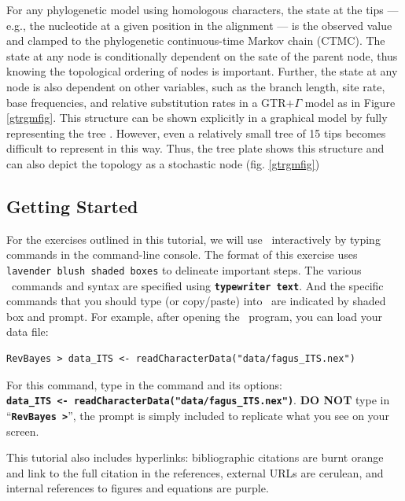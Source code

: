 \documentclass[11pt]{article}
\newcommand{\cl}[1]{{\texttt{\textbf{#1}}}}
\begin{document}
For any phylogenetic model using homologous characters, the state at the tips --- e.g., the nucleotide at a given position in the alignment --- is the observed value and clamped to the phylogenetic continuous-time Markov chain (CTMC). 
The state at any node is conditionally dependent on the sate of the parent node, thus knowing the topological ordering of nodes is important. 
Further, the state at any node is also dependent on other variables, such as the branch length, site rate, base frequencies, and relative substitution rates in a GTR$+\Gamma$ model as in Figure \ref{gtrgmfig}. 
This structure can be shown explicitly in a graphical model by fully representing the tree \citep[for examples see][]{hoehnaGM2014}.
However, even a relatively small tree of 15 tips becomes difficult to represent in this way. 
Thus, the tree plate shows this structure and can also depict the topology as a stochastic node (fig. \ref{gtrgmfig})



\bigskip
\subsection{Getting Started}

For the exercises outlined in this tutorial, we will use \RevBayes~interactively by typing commands in the command-line console.
The format of this exercise uses \colorbox{shadecolor}{\tt lavender blush shaded boxes} to delineate important steps. 
The various \RevBayes~commands and syntax are specified using \cl{typewriter text}. 
And the specific commands that you should type (or copy/paste) into \RevBayes~are indicated by shaded box and prompt. 
For example, after opening the \RevBayes~program, you can load your data file:

{\tt \begin{snugshade*}
\begin{lstlisting}
RevBayes > data_ITS <- readCharacterData("data/fagus_ITS.nex")
\end{lstlisting}
\end{snugshade*}}

For this command, type in the command and its options:\\ \cl{data\_ITS <- readCharacterData("data/fagus\_ITS.nex")}. 
\textbf{DO NOT} type in ``\cl{RevBayes >}'', the prompt is simply included to replicate what you see on your screen. 

This tutorial also includes hyperlinks: bibliographic citations are {\textcolor{citescol}{burnt orange}} and link to the full citation in the references, external URLs are {\textcolor{urlscol}{cerulean}}, and internal references to figures and equations are {\textcolor{linkscol}{purple}}.
\end{document}

